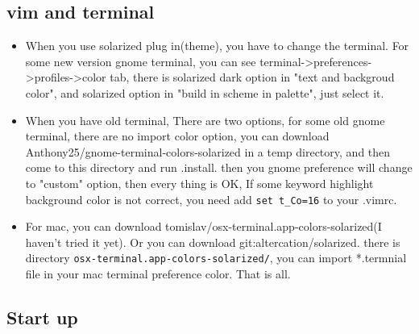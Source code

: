 \documentclass[a4paper,12pt,twoside]{book}
\begin{document}
\subsection{vim and terminal}
\begin{itemize}
    \item When you use solarized plug in(theme), you have to change the
        terminal. For some new version gnome terminal, you can see
        terminal->preferences->profiles->color tab, there is solarized dark
        option in "text and backgroud color", and solarized option in "build in scheme in palette", just select it.
    \item When you have old terminal, There are two options, for some old gnome
        terminal, there are no import color option, you can download
        Anthony25/gnome-terminal-colors-solarized in a temp directory, and then
        come to this directory and run .install. then you gnome preference will
        change to "custom" option, then every thing is OK, If some keyword
        highlight background color is not correct, you need add \verb!set t_Co=16! to your .vimrc. 
    \item For mac, you can download
        tomislav/osx-terminal.app-colors-solarized(I haven't tried it yet). Or
        you can download git:altercation/solarized. there is directory \verb!osx-terminal.app-colors-solarized/!, you can import *.termnial file in
        your mac terminal preference color. That is all.
\end{itemize}

\subsection{Start up}
\end{document}
